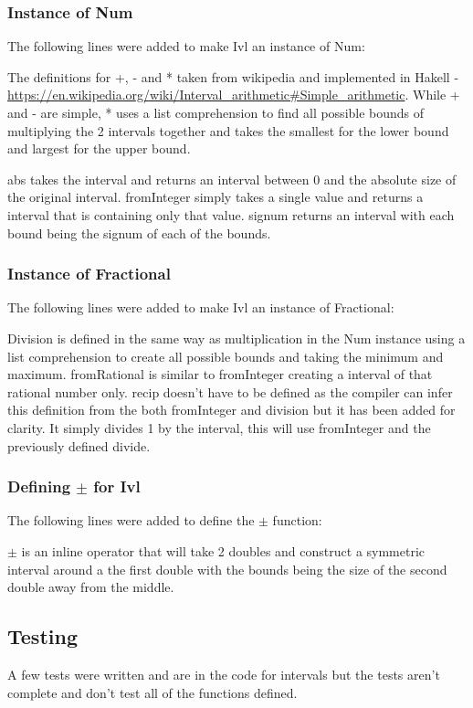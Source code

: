 \documentclass[a4paper]{article}
\begin{document}
\subsubsection{Instance of Num}
The following lines were added to make Ivl an instance of Num:

\par
The definitions for +, - and * taken from wikipedia and implemented in Hakell - \url{https://en.wikipedia.org/wiki/Interval_arithmetic#Simple_arithmetic}.
While + and - are simple, * uses a list comprehension to find all possible bounds of multiplying the 2 intervals together and takes the smallest for the lower bound and largest for the upper bound.
\par
abs takes the interval and returns an interval between 0 and the absolute size of the original interval.
fromInteger simply takes a single value and returns a interval that is containing only that value.
signum returns an interval with each bound being the signum of each of the bounds.

\subsubsection{Instance of Fractional}
The following lines were added to make Ivl an instance of Fractional:

\par
Division is defined in the same way as multiplication in the Num instance using a list comprehension to create all possible bounds and taking the minimum and maximum.
fromRational is similar to fromInteger creating a interval of that rational number only.
recip doesn't have to be defined as the compiler can infer this definition from the both fromInteger and division but it has been added for clarity.
It simply divides 1 by the interval, this will use fromInteger and the previously defined divide.

\subsubsection{Defining \( \pm \) for Ivl}
The following lines were added to define the \( \pm \) function:

\par
\( \pm \) is an inline operator that will take 2 doubles and construct a symmetric interval around a the first double with the bounds being the size of the second double away from the middle.

\subsection{Testing}
A few tests were written and are in the code for intervals but the tests aren't complete and don't test all of the functions defined.






% 
\end{document}
